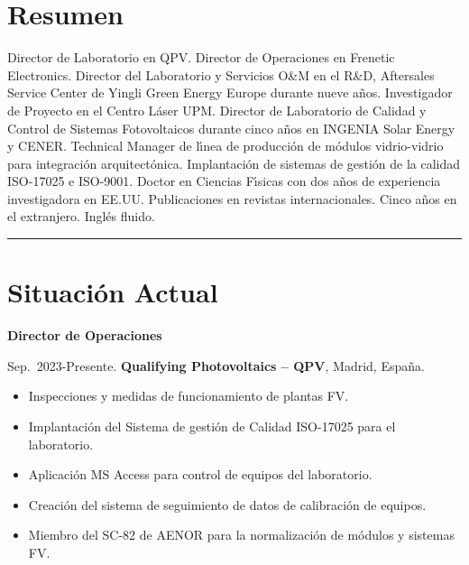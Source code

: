 \documentclass{article}
\begin{document}



\section*{Resumen}

Director de Laboratorio en QPV. Director de Operaciones en Frenetic Electronics. Director del Laboratorio y Servicios O{\&}M en el R{\&}D, Aftersales Service Center de Yingli Green Energy Europe durante nueve a\~nos.  Investigador de Proyecto en el Centro L\'aser UPM. Director de Laboratorio de Calidad y Control de Sistemas Fotovoltaicos durante cinco a\~nos en INGENIA Solar Energy y CENER. Technical Manager de l\'{\i}nea de producci\'on de m\'odulos vidrio-vidrio para integraci\'on arquitect\'onica. Implantaci\'on de sistemas de gesti\'on de la calidad ISO-17025 e ISO-9001. Doctor en Ciencias F\'{\i}sicas con dos a\~nos de experiencia investigadora en EE.UU. Publicaciones en revistas internacionales. Cinco a\~nos en el extranjero. Ingl\'es fluido.

\bigskip

\hrule


\section*{Situaci\'on Actual}

{\bf Director de Operaciones}

\medskip
Sep.~2023-Presente.
{\bf Qualifying Photovoltaics -- QPV},
Madrid, Espa\~na.

\begin{itemize}\itemsep 0pt
\item Inspecciones y medidas de funcionamiento de plantas FV.
\item Implantaci\'on del Sistema de gesti\'on de Calidad ISO-17025 para el laboratorio.
\item Aplicaci\'on MS Access para control de equipos del laboratorio.
\item Creaci\'on del sistema de seguimiento de datos de calibraci\'on de equipos.
\item Miembro del SC-82 de AENOR para la normalizaci\'on de m\'odulos y sistemas FV.
\end{itemize}
\end{document}
